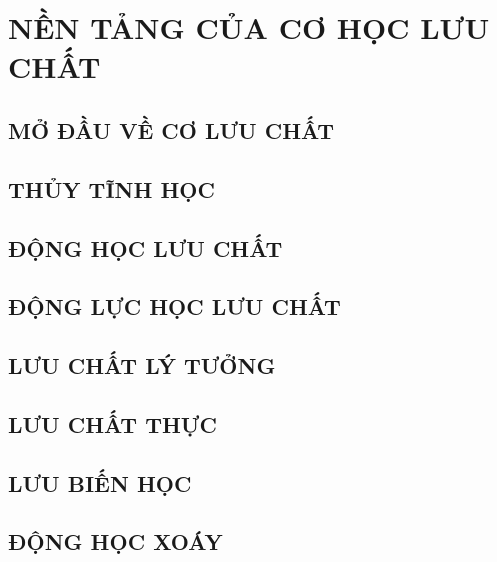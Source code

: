 \documentclass[../main.tex]{subfiles}
\begin{document}
\part{NỀN TẢNG CỦA CƠ HỌC LƯU CHẤT}
    \chapter{MỞ ĐẦU VỀ CƠ LƯU CHẤT}
        \newpage
        
    \chapter{THỦY TĨNH HỌC}

    \chapter{ĐỘNG HỌC LƯU CHẤT}

    \chapter{ĐỘNG LỰC HỌC LƯU CHẤT}

    \chapter{LƯU CHẤT LÝ TƯỞNG}

    \chapter{LƯU CHẤT THỰC}

    \chapter{LƯU BIẾN HỌC}

    \chapter{ĐỘNG HỌC XOÁY}
\end{document}
